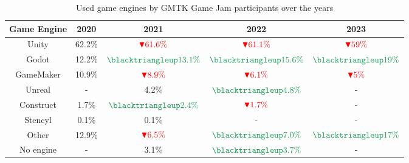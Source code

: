 \begin{table}[h!]
    \centering
    \begin{tabular}{|c c c c c|}
        \hline
        Game Engine & 2020   & 2021                                               & 2022                                               & 2023                                             \\
        \hline\hline
        Unity       & 62.2\% & $\textcolor{red}{\blacktriangledown 61.6\%}$       & $\textcolor{red}{\blacktriangledown 61.1\%}$       & $\textcolor{red}{\blacktriangledown 59\%}$       \\
        Godot       & 12.2\% & $\textcolor{ForestGreen}{\blacktriangleup 13.1\%}$ & $\textcolor{ForestGreen}{\blacktriangleup 15.6\%}$ & $\textcolor{ForestGreen}{\blacktriangleup 19\%}$ \\
        GameMaker   & 10.9\% & $\textcolor{red}{\blacktriangledown 8.9\% }$       & $\textcolor{red}{\blacktriangledown 6.1\%}$        & $\textcolor{red}{\blacktriangledown 5\%}$        \\
        Unreal      & -      & 4.2\%                                              & $\textcolor{ForestGreen}{\blacktriangleup 4.8\%}$  & -                                                \\
        Construct   & 1.7\%  & $\textcolor{ForestGreen}{\blacktriangleup 2.4\%}$  & $\textcolor{red}{\blacktriangledown 1.7\%}$        & -                                                \\
        Stencyl     & 0.1\%  & 0.1\%                                              & -                                                  & -                                                \\
        Other       & 12.9\% & $\textcolor{red}{\blacktriangledown 6.5\%}$        & $\textcolor{ForestGreen}{\blacktriangleup 7.0\%}$  & $\textcolor{ForestGreen}{\blacktriangleup 17\%}$ \\
        No engine   & -      & 3.1\%                                              & $\textcolor{ForestGreen}{\blacktriangleup 3.7\%}$  & -                                                \\
        \hline
    \end{tabular}
    \caption{Used game engines by GMTK Game Jam participants over the years \cite{gmtk-twitter}}
    \label{table:gmtk}
\end{table}

